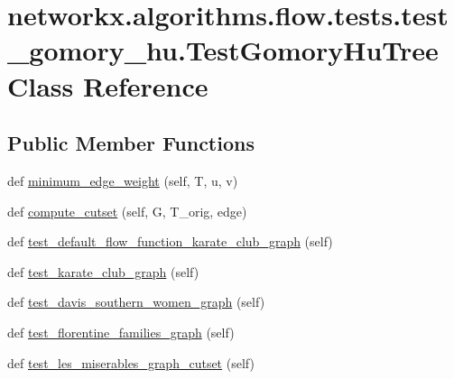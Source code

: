 \hypertarget{classnetworkx_1_1algorithms_1_1flow_1_1tests_1_1test__gomory__hu_1_1TestGomoryHuTree}{}\section{networkx.\+algorithms.\+flow.\+tests.\+test\+\_\+gomory\+\_\+hu.\+Test\+Gomory\+Hu\+Tree Class Reference}
\label{classnetworkx_1_1algorithms_1_1flow_1_1tests_1_1test__gomory__hu_1_1TestGomoryHuTree}
\subsection*{Public Member Functions}
\begin{DoxyCompactItemize}
\item 
def \hyperlink{classnetworkx_1_1algorithms_1_1flow_1_1tests_1_1test__gomory__hu_1_1TestGomoryHuTree_acaa6a122b3983d36a09f2d0e5a13c790}{minimum\+\_\+edge\+\_\+weight} (self, T, u, v)
\item 
def \hyperlink{classnetworkx_1_1algorithms_1_1flow_1_1tests_1_1test__gomory__hu_1_1TestGomoryHuTree_a0ac4c3448ef118a511feeb92f3b541ce}{compute\+\_\+cutset} (self, G, T\+\_\+orig, edge)
\item 
def \hyperlink{classnetworkx_1_1algorithms_1_1flow_1_1tests_1_1test__gomory__hu_1_1TestGomoryHuTree_a76e200f2a5a08a32c27aec3d4e6fdfc8}{test\+\_\+default\+\_\+flow\+\_\+function\+\_\+karate\+\_\+club\+\_\+graph} (self)
\item 
def \hyperlink{classnetworkx_1_1algorithms_1_1flow_1_1tests_1_1test__gomory__hu_1_1TestGomoryHuTree_a246d7b198845d63b5e543da5eb76bc9b}{test\+\_\+karate\+\_\+club\+\_\+graph} (self)
\item 
def \hyperlink{classnetworkx_1_1algorithms_1_1flow_1_1tests_1_1test__gomory__hu_1_1TestGomoryHuTree_a7457ec1d6819d89e4271823b5de09587}{test\+\_\+davis\+\_\+southern\+\_\+women\+\_\+graph} (self)
\item 
def \hyperlink{classnetworkx_1_1algorithms_1_1flow_1_1tests_1_1test__gomory__hu_1_1TestGomoryHuTree_a0a34b312cfb497ab42130861ea36b46d}{test\+\_\+florentine\+\_\+families\+\_\+graph} (self)
\item 
def \hyperlink{classnetworkx_1_1algorithms_1_1flow_1_1tests_1_1test__gomory__hu_1_1TestGomoryHuTree_a61f37970549a09617daf279883b6eb08}{test\+\_\+les\+\_\+miserables\+\_\+graph\+\_\+cutset} (self)
\item 

\end{DoxyCompactItemize}

